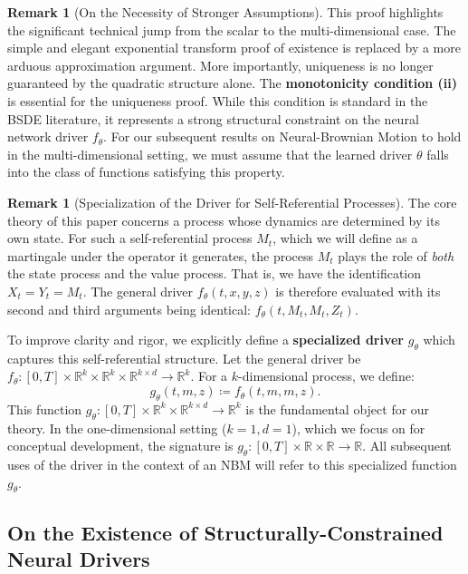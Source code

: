 \documentclass[qian]{imsart}
\newcommand{\R}{\mathbb{R}}
\theoremstyle{plain}
\theoremstyle{definition}
\newtheorem{remark}[theorem]{Remark}
\begin{document}
\begin{remark}[On the Necessity of Stronger Assumptions]
This proof highlights the significant technical jump from the scalar to the multi-dimensional case. The simple and elegant exponential transform proof of existence is replaced by a more arduous approximation argument. More importantly, uniqueness is no longer guaranteed by the quadratic structure alone. The \textbf{monotonicity condition (ii)} is essential for the uniqueness proof. While this condition is standard in the BSDE literature, it represents a strong structural constraint on the neural network driver $f_\theta$. For our subsequent results on Neural-Brownian Motion to hold in the multi-dimensional setting, we must assume that the learned driver $\theta$ falls into the class of functions satisfying this property.
\end{remark}

\begin{remark}[Specialization of the Driver for Self-Referential Processes]
\label{rem:driver_specialization}
The core theory of this paper concerns a process whose dynamics are determined by its own state. For such a self-referential process $M_t$, which we will define as a martingale under the operator it generates, the process $M_t$ plays the role of \textit{both} the state process and the value process. That is, we have the identification $X_t = Y_t = M_t$. The general driver $f_\theta(t,x,y,z)$ is therefore evaluated with its second and third arguments being identical: $f_\theta(t, M_t, M_t, Z_t)$.

To improve clarity and rigor, we explicitly define a \textbf{specialized driver} $g_\theta$ which captures this self-referential structure. Let the general driver be $f_\theta: [0,T] \times \R^k \times \R^k \times \R^{k \times d} \to \R^k$. For a $k$-dimensional process, we define:
\[ g_\theta(t, m, z) \coloneqq f_\theta(t, m, m, z). \]
This function $g_\theta: [0,T] \times \R^k \times \R^{k \times d} \to \R^k$ is the fundamental object for our theory. In the one-dimensional setting ($k=1, d=1$), which we focus on for conceptual development, the signature is $g_\theta: [0,T] \times \R \times \R \to \R$. All subsequent uses of the driver in the context of an NBM will refer to this specialized function $g_\theta$.
\end{remark}

\subsection{On the Existence of Structurally-Constrained Neural Drivers}
\end{document}
